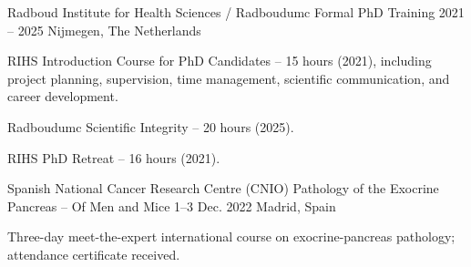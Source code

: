 \begin{cventries}
\cventry
  {Radboud Institute for Health Sciences / Radboudumc}
  {Formal PhD Training}
  {2021 -- 2025}
  {Nijmegen, The Netherlands}
  {
    \begin{cvitems}
      \item {RIHS Introduction Course for PhD Candidates -- 15 hours (2021), including project planning, supervision, time management, scientific communication, and career development.}
      \item {Radboudumc Scientific Integrity -- 20 hours (2025).}
      \item {RIHS PhD Retreat -- 16 hours (2021).}
    \end{cvitems}
  }

\cventry
  {Spanish National Cancer Research Centre (CNIO)}
  {Pathology of the Exocrine Pancreas -- Of Men and Mice}
  {1--3 Dec. 2022}
  {Madrid, Spain}
  {
    \begin{cvitems}
      \item {Three-day meet-the-expert international course on exocrine-pancreas pathology; attendance certificate received.}
    \end{cvitems}
  }
\end{cventries}
